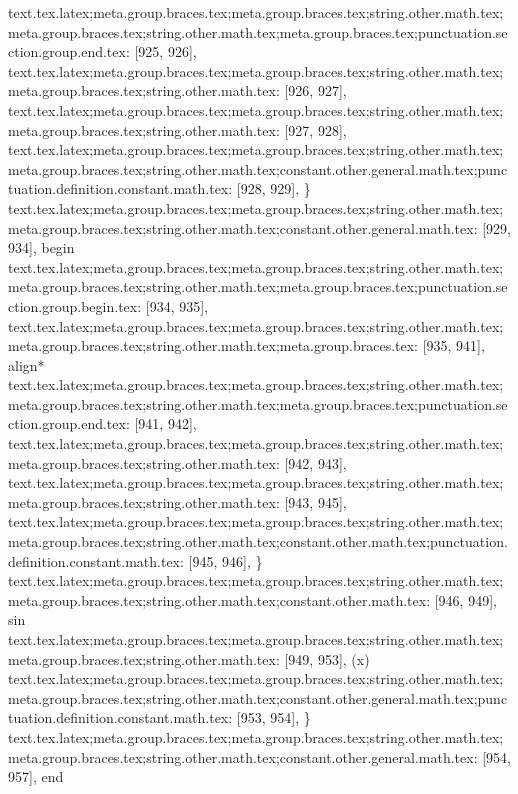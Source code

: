 {{{{{{{{{{{{{{{{{{{{{{{{{{{{{{text.tex.latex;meta.group.braces.tex;meta.group.braces.tex;string.other.math.tex;meta.group.braces.tex;string.other.math.tex;meta.group.braces.tex;punctuation.section.group.end.tex: [925, 926], {}}
text.tex.latex;meta.group.braces.tex;meta.group.braces.tex;string.other.math.tex;meta.group.braces.tex;string.other.math.tex: [926, 927], {
}
text.tex.latex;meta.group.braces.tex;meta.group.braces.tex;string.other.math.tex;meta.group.braces.tex;string.other.math.tex: [927, 928], {
}
text.tex.latex;meta.group.braces.tex;meta.group.braces.tex;string.other.math.tex;meta.group.braces.tex;string.other.math.tex;constant.other.general.math.tex;punctuation.definition.constant.math.tex: [928, 929], {\}
text.tex.latex;meta.group.braces.tex;meta.group.braces.tex;string.other.math.tex;meta.group.braces.tex;string.other.math.tex;constant.other.general.math.tex: [929, 934], {begin}
text.tex.latex;meta.group.braces.tex;meta.group.braces.tex;string.other.math.tex;meta.group.braces.tex;string.other.math.tex;meta.group.braces.tex;punctuation.section.group.begin.tex: [934, 935], {{}
text.tex.latex;meta.group.braces.tex;meta.group.braces.tex;string.other.math.tex;meta.group.braces.tex;string.other.math.tex;meta.group.braces.tex: [935, 941], {align*}
text.tex.latex;meta.group.braces.tex;meta.group.braces.tex;string.other.math.tex;meta.group.braces.tex;string.other.math.tex;meta.group.braces.tex;punctuation.section.group.end.tex: [941, 942], {}}
text.tex.latex;meta.group.braces.tex;meta.group.braces.tex;string.other.math.tex;meta.group.braces.tex;string.other.math.tex: [942, 943], {
}
text.tex.latex;meta.group.braces.tex;meta.group.braces.tex;string.other.math.tex;meta.group.braces.tex;string.other.math.tex: [943, 945], {  }
text.tex.latex;meta.group.braces.tex;meta.group.braces.tex;string.other.math.tex;meta.group.braces.tex;string.other.math.tex;constant.other.math.tex;punctuation.definition.constant.math.tex: [945, 946], {\}
text.tex.latex;meta.group.braces.tex;meta.group.braces.tex;string.other.math.tex;meta.group.braces.tex;string.other.math.tex;constant.other.math.tex: [946, 949], {sin}
text.tex.latex;meta.group.braces.tex;meta.group.braces.tex;string.other.math.tex;meta.group.braces.tex;string.other.math.tex: [949, 953], {(x)
}
text.tex.latex;meta.group.braces.tex;meta.group.braces.tex;string.other.math.tex;meta.group.braces.tex;string.other.math.tex;constant.other.general.math.tex;punctuation.definition.constant.math.tex: [953, 954], {\}
text.tex.latex;meta.group.braces.tex;meta.group.braces.tex;string.other.math.tex;meta.group.braces.tex;string.other.math.tex;constant.other.general.math.tex: [954, 957], {end}
}}}}}}}}}}}}}}}}}}}}}}}}}}}}}}}}
